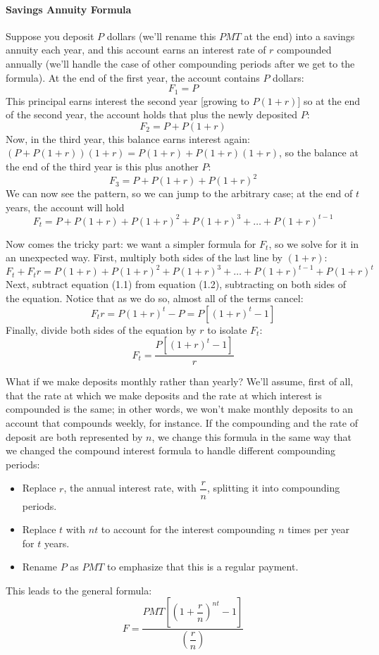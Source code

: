 \paragraph{Savings Annuity Formula}
Suppose you deposit $P$ dollars (we'll rename this $PMT$ at the end) into a savings annuity each year, and this account earns an interest rate of $r$ compounded annually (we'll handle the case of other compounding periods after we get to the formula).  At the end of the first year, the account contains $P$ dollars:
\[F_1 = P\]
This principal earns interest the second year [growing to $P(1+r)$] so at the end of the second year, the account holds that plus the newly deposited $P$:
\[F_2 = P+P(1+r)\]
Now, in the third year, this balance earns interest again: $(P+P(1+r))(1+r) = P(1+r) + P(1+r)(1+r)$, so the balance at the end of the third year is this plus another $P$:
\[F_3 = P + P(1+r) + P(1+r)^2\]
We can now see the pattern, so we can jump to the arbitrary case; at the end of $t$ years, the account will hold
\begin{equation}
F_t = P + P(1+r) + P(1+r)^2 + P(1+r)^3 + \ldots + P(1+r)^{t-1}
\end{equation}

Now comes the tricky part: we want a simpler formula for $F_t$, so we solve for it in an unexpected way.  First, multiply both sides of the last line by $(1+r)$:
\begin{equation}
F_t + F_tr = P(1+r) + P(1+r)^2 + P(1+r)^3 + \ldots + P(1+r)^{t-1} + P(1+r)^t
\end{equation}
Next, subtract equation (1.1) from equation (1.2), subtracting on both sides of the equation.  Notice that as we do so, almost all of the terms cancel:
\[F_tr = P(1+r)^t-P = P\left[(1+r)^t-1\right]\]
Finally, divide both sides of the equation by $r$ to isolate $F_t$:
\[F_t = \dfrac{P\left[(1+r)^t-1\right]}{r}\]

What if we make deposits monthly rather than yearly?  We'll assume, first of all, that the rate at which we make deposits and the rate at which interest is compounded is the same; in other words, we won't make monthly deposits to an account that compounds weekly, for instance.  If the compounding and the rate of deposit are both represented by $n$, we change this formula in the same way that we changed the compound interest formula to handle different compounding periods:
\begin{itemize}
\item Replace $r$, the annual interest rate, with $\dfrac{r}{n}$, splitting it into compounding periods.
\item Replace $t$ with $nt$ to account for the interest compounding $n$ times per year for $t$ years.
\item Rename $P$ as $PMT$ to emphasize that this is a regular payment.
\end{itemize}
This leads to the general formula:
\[\boxed{F=\dfrac{PMT\left[\left(1+\dfrac{r}{n}\right)^{nt}-1\right]}{\left(\dfrac{r}{n}\right)}}\]

